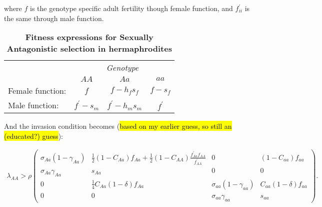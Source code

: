 \documentclass[11pt]{article}
\begin{document}
\noindent where $f$ is the genotype specific adult fertility though female function, and $f^{\prime}_{ii}$ is the same through male function. 
\begin{table}[htbp]
 \centering
 \caption{\bf Fitness expressions for Sexually Antagonistic selection in hermaphrodites}
\begin{tabular}{lccc}
 \toprule
					&  \multicolumn{3}{c}{{\textit{Genotype}}} \\ 
\cline{2-4}
					& $AA$			& $Aa$ 					& $aa$ 		\\ \hline
Female function:	& $f$		& $f - h_f s_f$	& $f - s_f$ \\	
Male function:		& $f^\prime - s_m$& $f^\prime - h_m s_m$	& $f^\prime$ 		\\	
\hline
\end{tabular}
\end{table}

And the invasion condition becomes (\hl{based on my earlier guess, so still an (educated?) guess}):

\begin{eqnarray} \label{eq:coexist_AA}
\lambda_{AA}> 
			\rho\left(
					\begin{array}{cc|cc}
						\sigma_{Aa}(1 - \gamma_{Aa}) &  \frac{1}{2} (1 - C_{Aa}) f_{Aa} +\frac{1}{2} (1 - C_{AA})\frac{f^\prime_{Aa}f_{AA}}{f^\prime_{AA}} &0 & (1-C_{aa})f_{aa}\\
						\sigma_{Aa} \gamma_{Aa}     & s_{Aa}& 0 & 0\\ \hline
							0 & \frac{1}{4}C_{Aa}(1-\delta)f_{Aa} &\sigma_{aa}(1 - \gamma_{aa})  & C_{aa}(1-\delta)f_{aa}\\
								0 & 0 & \sigma_{aa} \gamma_{aa}     & s_{aa}
					\end{array}
				\right). 
\end{eqnarray} 
\end{document}
